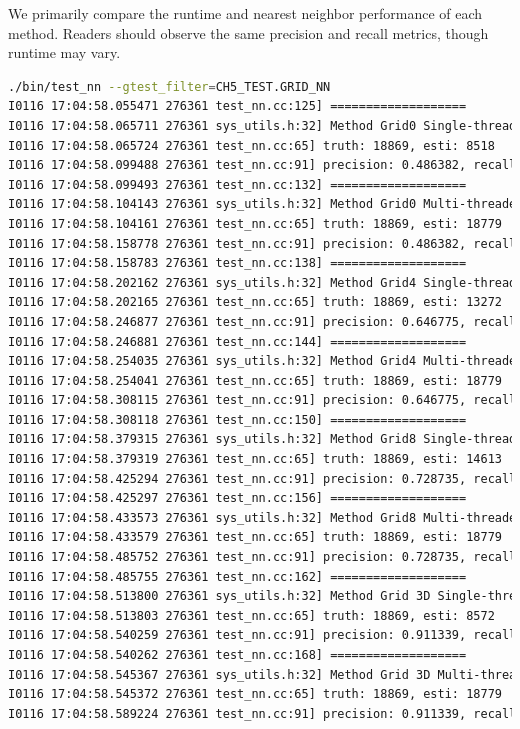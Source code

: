 We primarily compare the runtime and nearest neighbor performance of each method. Readers should observe the same precision and recall metrics, though runtime may vary.

\begin{lstlisting}[language=sh,caption=Terminal output:]
./bin/test_nn --gtest_filter=CH5_TEST.GRID_NN 
I0116 17:04:58.055471 276361 test_nn.cc:125] ===================
I0116 17:04:58.065711 276361 sys_utils.h:32] Method Grid0 Single-threaded average call time/iterations: 1.02376/10 ms.
I0116 17:04:58.065724 276361 test_nn.cc:65] truth: 18869, esti: 8518
I0116 17:04:58.099488 276361 test_nn.cc:91] precision: 0.486382, recall: 0.219566, fp: 4375, fn: 14726
I0116 17:04:58.099493 276361 test_nn.cc:132] ===================
I0116 17:04:58.104143 276361 sys_utils.h:32] Method Grid0 Multi-threaded average call time/iterations: 0.464818/10 ms.
I0116 17:04:58.104161 276361 test_nn.cc:65] truth: 18869, esti: 18779
I0116 17:04:58.158778 276361 test_nn.cc:91] precision: 0.486382, recall: 0.219566, fp: 4375, fn: 14726
I0116 17:04:58.158783 276361 test_nn.cc:138] ===================
I0116 17:04:58.202162 276361 sys_utils.h:32] Method Grid4 Single-threaded average call time/iterations: 4.33758/10 ms.
I0116 17:04:58.202165 276361 test_nn.cc:65] truth: 18869, esti: 13272
I0116 17:04:58.246877 276361 test_nn.cc:91] precision: 0.646775, recall: 0.454926, fp: 4688, fn: 10285
I0116 17:04:58.246881 276361 test_nn.cc:144] ===================
I0116 17:04:58.254035 276361 sys_utils.h:32] Method Grid4 Multi-threaded average call time/iterations: 0.715278/10 ms.
I0116 17:04:58.254041 276361 test_nn.cc:65] truth: 18869, esti: 18779
I0116 17:04:58.308115 276361 test_nn.cc:91] precision: 0.646775, recall: 0.454926, fp: 4688, fn: 10285
I0116 17:04:58.308118 276361 test_nn.cc:150] ===================
I0116 17:04:58.379315 276361 sys_utils.h:32] Method Grid8 Single-threaded average call time/iterations: 7.11945/10 ms.
I0116 17:04:58.379319 276361 test_nn.cc:65] truth: 18869, esti: 14613
I0116 17:04:58.425294 276361 test_nn.cc:91] precision: 0.728735, recall: 0.564365, fp: 3964, fn: 8220
I0116 17:04:58.425297 276361 test_nn.cc:156] ===================
I0116 17:04:58.433573 276361 sys_utils.h:32] Method Grid8 Multi-threaded average call time/iterations: 0.827275/10 ms.
I0116 17:04:58.433579 276361 test_nn.cc:65] truth: 18869, esti: 18779
I0116 17:04:58.485752 276361 test_nn.cc:91] precision: 0.728735, recall: 0.564365, fp: 3964, fn: 8220
I0116 17:04:58.485755 276361 test_nn.cc:162] ===================
I0116 17:04:58.513800 276361 sys_utils.h:32] Method Grid 3D Single-threaded average call time/iterations: 2.80424/10 ms.
I0116 17:04:58.513803 276361 test_nn.cc:65] truth: 18869, esti: 8572
I0116 17:04:58.540259 276361 test_nn.cc:91] precision: 0.911339, recall: 0.414012, fp: 760, fn: 11057
I0116 17:04:58.540262 276361 test_nn.cc:168] ===================
I0116 17:04:58.545367 276361 sys_utils.h:32] Method Grid 3D Multi-threaded average call time/iterations: 0.510082/10 ms.
I0116 17:04:58.545372 276361 test_nn.cc:65] truth: 18869, esti: 18779
I0116 17:04:58.589224 276361 test_nn.cc:91] precision: 0.911339, recall: 0.414012, fp: 760, fn: 11057
\end{lstlisting}

